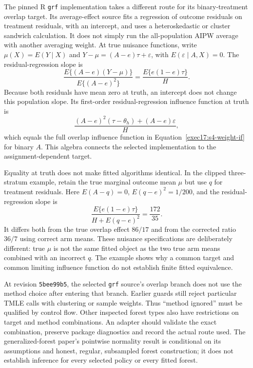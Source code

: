 The pinned R \texttt{grf} implementation takes a different route for its
binary-treatment overlap target. Its average-effect source fits a regression
of outcome residuals on treatment residuals, with an intercept, and uses a
heteroskedastic or cluster sandwich calculation. It does not simply run the
all-population AIPW average with another averaging weight. At true nuisance
functions, write $\mu(X)=E(Y\mid X)$ and
$Y-\mu=(A-e)\tau+\varepsilon$, with $E(\varepsilon\mid A,X)=0$.
The residual-regression slope is
\[
 \frac{E\{(A-e)(Y-\mu)\}}{E\{(A-e)^2\}}
       =\frac{E\{e(1-e)\tau\}}{H}.
\]
Because both residuals have mean zero at truth, an intercept does not change
this population slope. Its first-order residual-regression influence function
at truth is
\[
 \frac{(A-e)^2(\tau-\theta_h)+(A-e)\varepsilon}{H},
\]
which equals the full overlap influence function in
Equation~\eqref{exec17:s4-weight-if} for binary $A$.
This algebra connects the selected implementation to the assignment-dependent
target.~\citep{exec13_grf_rpath,exec17_s4_math}

Equality at truth does not make fitted algorithms identical. In the clipped
three-stratum example, retain the true marginal outcome mean $\mu$ but use
$q$ for treatment residuals. Here $E(A-q)=0$,
$E(q-e)^2=1/200$, and the residual-regression slope is
\[
 \frac{E\{e(1-e)\tau\}}{H+E(q-e)^2}=\frac{172}{35}.
\]
It differs both from the true overlap effect $86/17$ and from the corrected
ratio $36/7$ using correct arm means. These nuisance specifications are
deliberately different: true $\mu$ is not the same fitted object as the two
true arm means combined with an incorrect $q$. The example shows why a
common target and common limiting influence function do not establish
finite fitted equivalence.~\citep{exec17_s4_math}

At revision \texttt{5bee99b5}, the selected \texttt{grf} source's overlap branch
does not use the method choice after entering that branch. Earlier guards
still reject particular TMLE calls with clustering or sample weights. Thus
``method ignored'' must be qualified by control flow. Other inspected forest
types also have restrictions on target and method combinations. An adapter
should validate the exact combination, preserve package diagnostics and
record the actual route used. The generalized-forest paper's pointwise
normality result is conditional on its assumptions and honest, regular,
subsampled forest construction; it does not establish inference for every
selected policy or every fitted forest.~\citep{exec13_grf_rpath,exec13_grf_native,grf2018}

